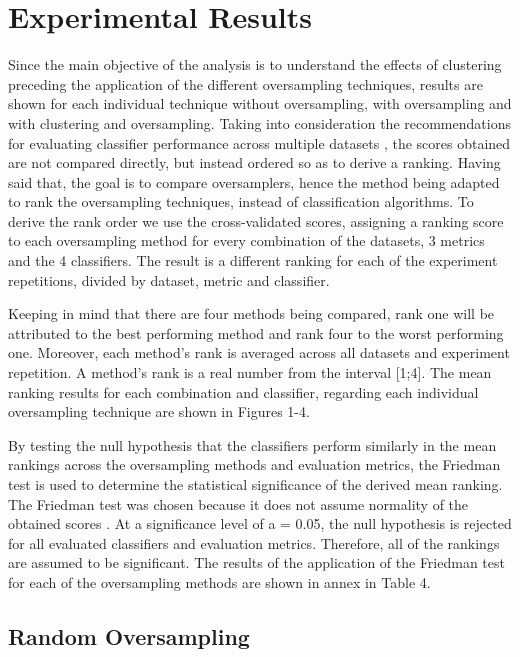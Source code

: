 \documentclass[parskip=full]{scrartcl}
\begin{document}
\section{Experimental Results}

Since the main objective of the analysis is to understand the effects of 
clustering preceding the application of the different oversampling techniques, 
results are shown for each individual technique without oversampling, with 
oversampling and with clustering and oversampling. Taking into consideration 
the recommendations for evaluating classifier performance across multiple 
datasets \cite{Demsar2006}, the scores obtained are not compared directly, but 
instead ordered so as to derive a ranking. Having said that, the goal is to 
compare oversamplers, hence the method being adapted to rank the oversampling 
techniques, instead of classification algorithms. To derive the rank order we 
use the cross-validated scores, assigning a ranking score to each oversampling 
method for every combination of the datasets, 3 metrics and the 4 classifiers. 
The result is a different ranking for each of the experiment repetitions, 
divided by dataset, metric and classifier. 

Keeping in mind that there are four methods being compared, rank one will be 
attributed to the best performing method and rank four to the worst performing 
one. Moreover, each method's rank is averaged across all datasets and 
experiment repetition. A method's rank is a real number from the interval 
[1;4]. The mean ranking results for each combination and classifier, regarding 
each individual oversampling technique are shown in Figures 1-4.

By testing the null hypothesis that the classifiers perform similarly in the 
mean rankings across the oversampling methods and evaluation metrics, the 
Friedman test \cite{Friedman1937} is used to determine the statistical 
significance of the derived mean ranking. The Friedman test was chosen because 
it does not assume normality of the obtained scores \cite{Demsar2006}. At a 
significance level of a = 0.05, the null hypothesis is rejected for all 
evaluated classifiers and evaluation metrics. Therefore, all of the rankings 
are assumed to be significant. The results of the application of the Friedman 
test for each of the oversampling methods are shown in annex in Table 4.

\subsection{Random Oversampling}
\end{document}
